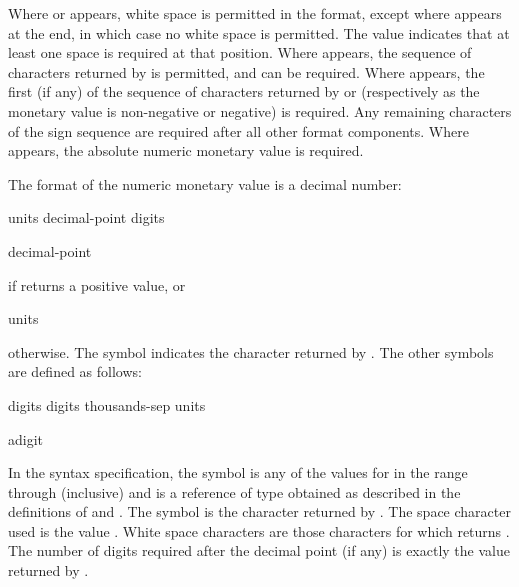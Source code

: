 \pnum
Where
or
appears, white space is permitted in the format,
except where
appears at the end, in which case no white space is permitted.
The value
indicates that at least one space is required at that position.
Where
appears, the sequence of characters returned by
is permitted, and can be required.
Where
appears, the first (if any) of the sequence of characters returned by
or
(respectively as the monetary value is non-negative or negative) is required.
Any remaining characters of the sign sequence are required after all
other format components.
Where
appears, the absolute numeric monetary value is required.

\pnum
The format of the numeric monetary value is a decimal number:
\begin{ncbnf}
\br
    units \br
    decimal-point digits
\end{ncbnf}
\begin{ncbnf}
\br
    decimal-point 
\end{ncbnf}
if  returns a positive value, or
\begin{ncbnf}
\br
    units
\end{ncbnf}
otherwise.
The symbol 
indicates the character returned by .
The other symbols are defined as follows:

\begin{ncbnf}
\br
    digits\br
    digits thousands-sep units
\end{ncbnf}

\begin{ncbnf}
\br
    adigit 
\end{ncbnf}

In the syntax specification, the symbol 
is any of the values 
for  in the range  through  (inclusive) and
 is a reference of type 
obtained as described in the definitions
of  and .
The symbol 
is the character returned by .
The space character used is the value .
White space characters are those characters 
for which  returns .
The number of digits required after the decimal point (if any)
is exactly the value returned by .

